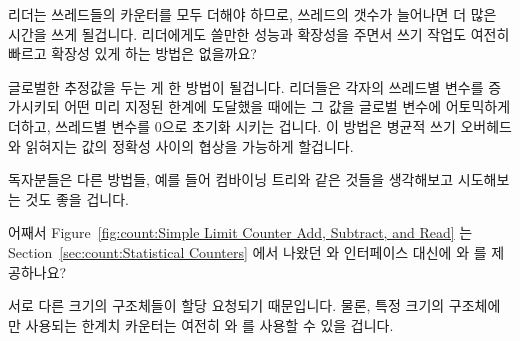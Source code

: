 \begin{enumerate}
\QuickQ{}
	리더는 쓰레드들의 카운터를 모두 더해야 하므로, 쓰레드의 갯수가 늘어나면
	더 많은 시간을 쓰게 될겁니다.
	리더에게도 쓸만한 성능과 확장성을 주면서 쓰기 작업도 여전히 빠르고
	확장성 있게 하는 방법은 없을까요?

\QuickA{}
	글로벌한 추정값을 두는 게 한 방법이 될겁니다.
	리더들은 각자의 쓰레드별 변수를 증가시키되 어떤 미리 지정된 한계에
	도달했을 때에는 그 값을 글로벌 변수에 어토믹하게 더하고, 쓰레드별
	변수를 0으로 초기화 시키는 겁니다.
	이 방법은 병균적 쓰기 오버헤드와 읽혀지는 값의 정확성 사이의 협상을
	가능하게 할겁니다.

	독자분들은 다른 방법들, 예를 들어 컴바이닝 트리와 같은 것들을
	생각해보고 시도해보는 것도 좋을 겁니다.

\QuickQ{}
	어째서
	Figure~\ref{fig:count:Simple Limit Counter Add, Subtract, and Read}
	는 Section~\ref{sec:count:Statistical Counters} 에서 나왔던
	 와  인터페이스 대신에
	 와  를 제공하나요?

\QuickA{}
	서로 다른 크기의 구조체들이 할당 요청되기 때문입니다.
	물론, 특정 크기의 구조체에만 사용되는 한계치 카운터는 여전히
	 와  를 사용할 수 있을 겁니다.

\end{enumerate}
